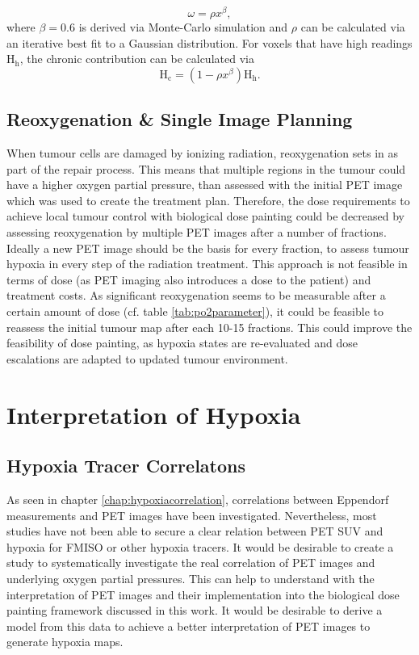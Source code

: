 \begin{equation}
\omega = \rho x^\beta,
\end{equation}
where $\beta=0.6$ is derived via Monte-Carlo simulation and $\rho$ can be calculated via an iterative best fit to a Gaussian distribution. For voxels that have high readings H$_\mathrm{h}$, the chronic contribution can be calculated via
\begin{equation}
\mathrm{H}_\mathrm{c} = (1-\rho x^\beta)\mathrm{H}_\mathrm{h}.
\end{equation}
\subsection{Reoxygenation \& Single Image Planning}\label{chap:reoxygenation}
When tumour cells are damaged by ionizing radiation, reoxygenation sets in as part of the repair process. This means that multiple regions in the tumour could have a higher oxygen partial pressure, than assessed with the initial PET image which was used to create the treatment plan. Therefore, the dose requirements to achieve local tumour control with biological dose painting could be decreased by assessing reoxygenation by multiple PET images after a number of fractions. Ideally a new PET image should be the basis for every fraction, to assess tumour hypoxia in every step of the radiation treatment. This approach is not feasible in terms of dose (as PET imaging also introduces a dose to the patient) and treatment costs. As significant reoxygenation seems to be measurable after a certain amount of dose (cf. table \ref{tab:po2parameter}), it could be feasible to reassess the initial tumour map after each 10-15 fractions. This could improve the feasibility of dose painting, as hypoxia states are re-evaluated and dose escalations are adapted to updated tumour environment. 
\section{Interpretation of Hypoxia}
\subsection{Hypoxia Tracer Correlatons}
As seen in chapter \ref{chap:hypoxiacorrelation}, correlations between Eppendorf measurements and PET images have been investigated. Nevertheless, most studies have not been able to secure a clear relation between PET SUV and hypoxia for FMISO or other hypoxia tracers. It would be desirable to create a study to systematically investigate the real correlation of PET images and underlying oxygen partial pressures. This can help to understand with the interpretation of PET images and their implementation into the biological dose painting framework discussed in this work. It would be desirable to derive a model from this data to achieve a better interpretation of PET images to generate hypoxia maps.
